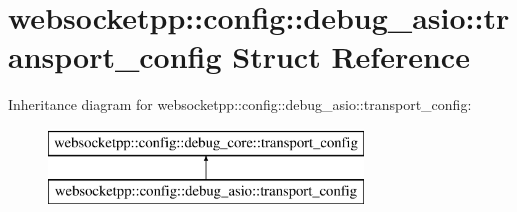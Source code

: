 \hypertarget{structwebsocketpp_1_1config_1_1debug__asio_1_1transport__config}{}\section{websocketpp\+:\+:config\+:\+:debug\+\_\+asio\+:\+:transport\+\_\+config Struct Reference}
\label{structwebsocketpp_1_1config_1_1debug__asio_1_1transport__config}
Inheritance diagram for websocketpp\+:\+:config\+:\+:debug\+\_\+asio\+:\+:transport\+\_\+config\+:\begin{figure}[H]
\begin{center}
\leavevmode
\includegraphics[height=2.000000cm]{structwebsocketpp_1_1config_1_1debug__asio_1_1transport__config}
\end{center}
\end{figure}
